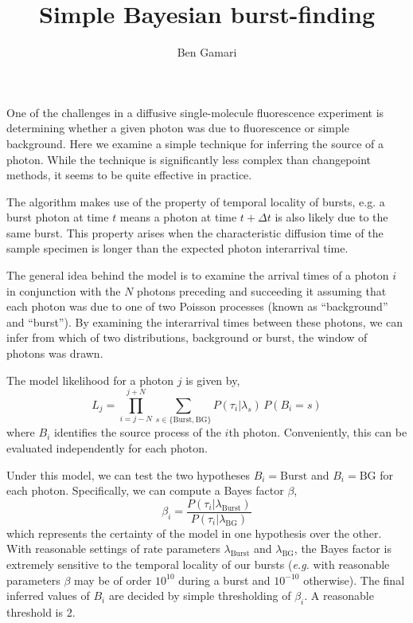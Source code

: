 \documentclass{article}
\title{Simple Bayesian burst-finding}
\author{Ben Gamari}
\newcommand{\lburst}{\ensuremath{\lambda_\mathrm{Burst}}}
\newcommand{\lbg}{\ensuremath{\lambda_\mathrm{BG}}}
\begin{document}
\maketitle

One of the challenges in a diffusive single-molecule fluorescence
experiment is determining whether a given photon was due to
fluorescence or simple background. Here we examine a simple technique
for inferring the source of a photon. While the technique is
significantly less complex than changepoint
methods\cite{watkins2005,ensign2010}, it seems to be quite effective
in practice.

The algorithm makes use of the property of temporal locality of
bursts, e.g. a burst photon at time $t$ means a photon at time $t +
\Delta t$ is also likely due to the same burst. This property arises
when the characteristic diffusion time of the sample specimen is 
longer than the expected photon interarrival time.

The general idea behind the model is to examine the arrival times of a
photon $i$ in conjunction with the $N$ photons preceding and
succeeding it assuming that each photon was due to one of two Poisson
processes (known as ``background'' and ``burst''). By examining the
interarrival times between these photons, we can infer from which of
two distributions, background or burst, the window of photons was
drawn.

The model likelihood for a photon $j$ is given by,
\begin{equation}
  L_j = \prod_{i=j-N}^{j+N} \sum_{s\in\{\mathrm{Burst}, \mathrm{BG}\}} P(\tau_i \vert \lambda_s)\, P(B_i = s)
\end{equation}
where $B_i$ identifies the source process of the $i$th photon.
Conveniently, this can be evaluated independently for each photon.

Under this model, we can test the two hypotheses $B_i =
\mathrm{Burst}$ and $B_i = \mathrm{BG}$ for each photon. Specifically,
we can compute a Bayes factor $\beta$,
\begin{equation}
  \beta_i = \frac{P(\tau_i \vert \lburst)}{P(\tau_i \vert \lbg)}
\end{equation}
which represents the certainty of the model in one hypothesis over the
other. With reasonable settings of rate parameters $\lburst$ and
$\lbg$, the Bayes factor is extremely sensitive to the temporal
locality of our bursts ({\it e.g.} with reasonable parameters $\beta$
may be of order $10^{10}$ during a burst and $10^{-10}$
otherwise). The final inferred values of $B_i$ are decided by simple
thresholding of $\beta_i$. A reasonable threshold is 2.
\end{document}
